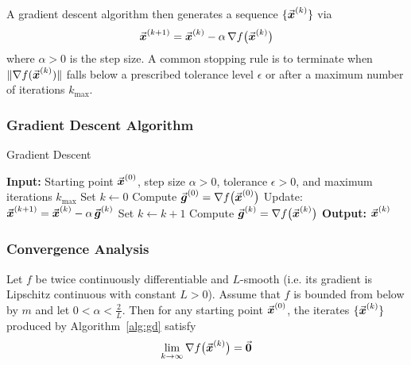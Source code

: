 A gradient descent algorithm then generates a sequence \(\{\vec{\boldsymbol{x}}^{(k)}\}\) via
\[
\vec{\boldsymbol{x}}^{(k+1)}=\vec{\boldsymbol{x}}^{(k)}-\alpha\,\nabla f\bigl(\vec{\boldsymbol{x}}^{(k)}\bigr)
\]
where \(\alpha>0\) is the step size. 
A common stopping rule is to terminate when \(\|\nabla f(\vec{\boldsymbol{x}}^{(k)})\|\) falls below a prescribed tolerance level \(\epsilon\) or after a maximum number of iterations \(k_{\max}\).

\subsubsection{Gradient Descent Algorithm}
\begin{algorithm}[H]
\caption{Gradient Descent}\label{alg:gd}
\begin{algorithmic}[1]
    \State \textbf{Input:} Starting point \(\vec{\boldsymbol{x}}^{(0)}\), step size \(\alpha>0\), tolerance \(\epsilon>0\), and maximum iterations \(k_{\max}\)
    \State Set \(k\gets0\)
    \State Compute \(\vec{\boldsymbol{g}}^{(0)}=\nabla f\bigl(\vec{\boldsymbol{x}}^{(0)}\bigr)\)
        \State Update: \(\vec{\boldsymbol{x}}^{(k+1)}=\vec{\boldsymbol{x}}^{(k)}-\alpha\,\vec{\boldsymbol{g}}^{(k)}\)
        \State Set \(k\gets k+1\)
        \State Compute \(\vec{\boldsymbol{g}}^{(k)}=\nabla f\bigl(\vec{\boldsymbol{x}}^{(k)}\bigr)\)
    \EndWhile
    \State \textbf{Output:} \(\vec{\boldsymbol{x}}^{(k)}\)
\end{algorithmic}
\end{algorithm}

\subsubsection{Convergence Analysis}
\label{subsec:gd_convergence}
\begin{theorem}
\label{thm:gd_conv}
Let \(f\) be twice continuously differentiable and \(L\)-smooth (i.e. its gradient is Lipschitz continuous with constant \(L>0\)). Assume that \(f\) is bounded from below by \(m\) and let \( 0<\alpha<\frac{2}{L}\).
Then for any starting point \(\vec{\boldsymbol{x}}^{(0)}\), the iterates \(\{\vec{\boldsymbol{x}}^{(k)}\}\) produced by Algorithm~\ref{alg:gd} satisfy
\begin{equation}
\label{eq:gd_conv}
\lim_{k\to\infty}\nabla f\bigl(\vec{\boldsymbol{x}}^{(k)}\bigr)=\vec{\boldsymbol{0}}
\end{equation}
\end{theorem}

